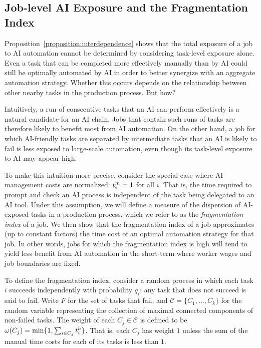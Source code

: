 \documentclass{article}
\theoremstyle{plain}
\theoremstyle{plain}
\begin{document}
\subsection{Job-level AI Exposure and the Fragmentation Index}

Proposition~\ref{proposition:interdependence} shows that the total exposure of a job to AI automation cannot be determined by considering task-level exposure alone. Even a task that can be completed more effectively manually than by AI could still be optimally automated by AI in order to better synergize with an aggregate automation strategy.  Whether this occurs depends on the relationship between other nearby tasks in the production process.  But how?

Intuitively, a run of consecutive tasks that an AI can perform effectively is a natural candidate for an AI chain.  Jobs that contain such runs of tasks are therefore likely to benefit most from AI automation.  On the other hand, a job for which AI-friendly tasks are separated by intermediate tasks that an AI is likely to fail is less exposed to large-scale automation, even though its task-level exposure to AI may appear high.

To make this intuition more precise, consider the special case where AI management costs are normalized: $t^{m}_{i} = 1$ for all $i$.  That is, the time required to prompt and check an AI process is independent of the task being delegated to an AI tool.  Under this assumption, we will define a measure of the dispersion of AI-exposed tasks in a production process, which we refer to as the \emph{fragmentation index} of a job.  We then show that the fragmentation index of a job approximates (up to constant factors) the time cost of an optimal automation strategy for that job.  In other words, jobs for which the fragmentation index is high will tend to yield less benefit from AI automation in the short-term where worker wages and job boundaries are fixed.

To define the fragmentation index, consider a random process in which each task $i$ succeeds independently with probability $q_i$; any task that does not succeed is said to fail.  Write $F$ for the set of tasks that fail, and $\mathcal{C} = \{C_1, \dotsc, C_k\}$ for the random variable representing the collection of maximal connected components of non-failed tasks.  The weight of each $C_j \in \mathcal{C}$ is defined to be $\omega(C_j) = \min\{ 1, \sum_{i \in C_j} t^{h}_{i} \}$.  That is, each $C_j$ has weight $1$ unless the sum of the manual time costs for each of its tasks is less than $1$.
\end{document}
